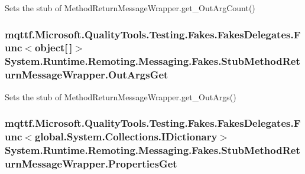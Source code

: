 Sets the stub of Method\-Return\-Message\-Wrapper.\-get\-\_\-\-Out\-Arg\-Count()

\hypertarget{class_system_1_1_runtime_1_1_remoting_1_1_messaging_1_1_fakes_1_1_stub_method_return_message_wrapper_acb756d0840e7a58ca058945ee398751c}{
\subsubsection[{Out\-Args\-Get}]{\setlength{\rightskip}{0pt plus 5cm}mqttf.\-Microsoft.\-Quality\-Tools.\-Testing.\-Fakes.\-Fakes\-Delegates.\-Func$<$object\mbox{[}$\,$\mbox{]}$>$ System.\-Runtime.\-Remoting.\-Messaging.\-Fakes.\-Stub\-Method\-Return\-Message\-Wrapper.\-Out\-Args\-Get}}\label{class_system_1_1_runtime_1_1_remoting_1_1_messaging_1_1_fakes_1_1_stub_method_return_message_wrapper_acb756d0840e7a58ca058945ee398751c}


Sets the stub of Method\-Return\-Message\-Wrapper.\-get\-\_\-\-Out\-Args()

\hypertarget{class_system_1_1_runtime_1_1_remoting_1_1_messaging_1_1_fakes_1_1_stub_method_return_message_wrapper_a0d0672e2737207eee9d0730ea7b7ac0d}{
\subsubsection[{Properties\-Get}]{\setlength{\rightskip}{0pt plus 5cm}mqttf.\-Microsoft.\-Quality\-Tools.\-Testing.\-Fakes.\-Fakes\-Delegates.\-Func$<$global.\-System.\-Collections.\-I\-Dictionary$>$ System.\-Runtime.\-Remoting.\-Messaging.\-Fakes.\-Stub\-Method\-Return\-Message\-Wrapper.\-Properties\-Get}}\label{class_system_1_1_runtime_1_1_remoting_1_1_messaging_1_1_fakes_1_1_stub_method_return_message_wrapper_a0d0672e2737207eee9d0730ea7b7ac0d}


